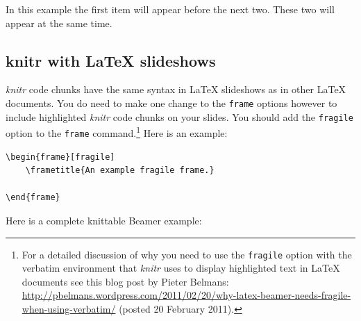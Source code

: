 {\noindent In this example the first item will appear before the next two. These two will appear at the same time.

\subsection{knitr with LaTeX slideshows}

\noindent \emph{knitr} code chunks have the same syntax in LaTeX slideshows as in other LaTeX documents. You do need to make one change to the \texttt{frame} options however to include highlighted {\emph{knitr}} code chunks on your slides. You should add the \texttt{fragile} option to the \texttt{frame} command.\footnote{For a detailed discussion of why you need to use the \texttt{fragile} option with the verbatim environment that {\emph{knitr}} uses to display highlighted text in LaTeX documents see this blog post by Pieter Belmans: \url{http://pbelmans.wordpress.com/2011/02/20/why-latex-beamer-needs-fragile-when-using-verbatim/} (posted 20 February 2011).} Here is an example:

\begin{knitrout}
    \color{fgcolor}
    \begin{kframe}
        \begin{verbatim}
\begin{frame}[fragile]
    \frametitle{An example fragile frame.}

\end{frame}
            \end{verbatim}
        \end{kframe}
\end{knitrout}

\noindent Here is a complete knittable Beamer example:

{\scriptsize
\begin{knitrout}
    \color{fgcolor}
\end{knitrout}}}
